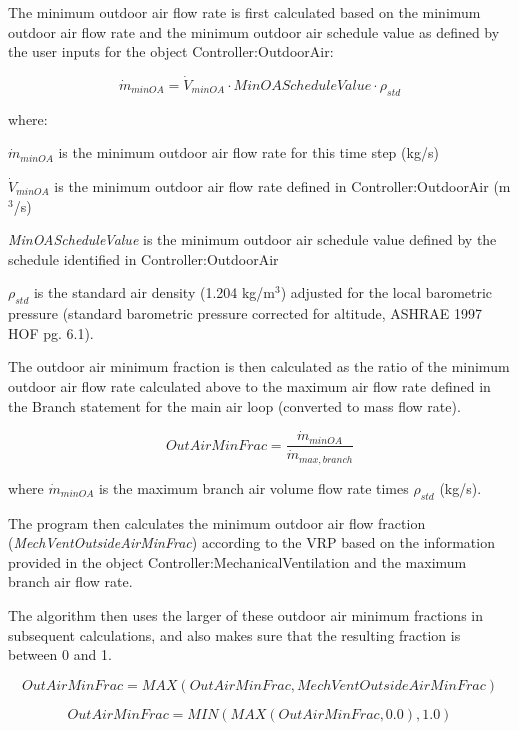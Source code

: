 The minimum outdoor air flow rate is first calculated based on the minimum outdoor air flow rate and the minimum outdoor air schedule value as defined by the user inputs for the object Controller:OutdoorAir:

\begin{equation}
\dot{m}_{minOA} = \dot{V}_{minOA} \cdot MinOAScheduleValue \cdot {\rho_{std}}
\end{equation}

where:

\({\dot{m}_{minOA}}\) is the minimum outdoor air flow rate for this time step (kg/s)

\({\dot{V}_{minOA}}\) is the minimum outdoor air flow rate defined in Controller:OutdoorAir (m\(^{3}\)/s)

\emph{MinOAScheduleValue} is the minimum outdoor air schedule value defined by the schedule identified in Controller:OutdoorAir

\({\rho_{std}}\) is the standard air density (1.204 kg/m\(^{3}\)) adjusted for the local barometric pressure (standard barometric pressure corrected for altitude, ASHRAE 1997 HOF pg. 6.1).

The outdoor air minimum fraction is then calculated as the ratio of the minimum outdoor air flow rate calculated above to the maximum air flow rate defined in the Branch statement for the main air loop (converted to mass flow rate).

\begin{equation}
  OutAirMinFrac = \frac{\dot{m}_{minOA}}{\dot{m}_{max,branch}}
\end{equation}

where \({\dot{m}_{minOA}}\) is the maximum branch air volume flow rate times \(\rho_{std}\) (kg/s).

The program then calculates the minimum outdoor air flow fraction (\emph{MechVentOutsideAirMinFrac}) according to the VRP based on the information provided in the object Controller:MechanicalVentilation and the maximum branch air flow rate.

The algorithm then uses the larger of these outdoor air minimum fractions in subsequent calculations, and also makes sure that the resulting fraction is between 0 and 1.

\begin{equation}
OutAirMinFrac = MAX\left( {OutAirMinFrac,MechVentOutsideAirMinFrac} \right)
\end{equation}

\begin{equation}
OutAirMinFrac = MIN\left( {MAX\left( {OutAirMinFrac,0.0} \right),1.0} \right)
\end{equation}

